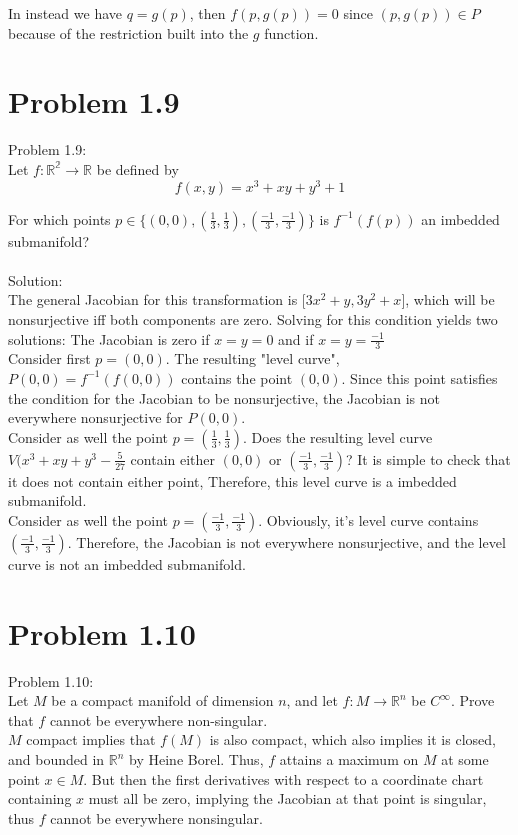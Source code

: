 \documentclass[paper=a4, fontsize=11pt]{scrartcl} %
\numberwithin{equation}{section} %
\numberwithin{figure}{section} %
\numberwithin{table}{section} %
\begin{document}
In instead we have $q = g(p)$, then $f(p, g(p)) = 0$ since $(p, g(p)) \in P$ because of the restriction built into the $g$ function.




\section*{Problem 1.9}

Problem 1.9:\\
Let $f:\mathbb{R^2} \to \mathbb{R}$ be defined by
\[
f(x,y) = x^3 + xy + y^3 + 1
\]

For which points $p \in \{(0,0),(\frac{1}{3},\frac{1}{3}),(\frac{-1}{3},\frac{-1}{3})\}$
is $f^{-1}({f(p)})$ an imbedded submanifold?\\
\\


Solution:\\
The general Jacobian for this transformation is $\big[3x^2 + y, 3y^2 + x\big]$, which will be nonsurjective
iff both components are zero.
Solving for this condition yields two solutions: The Jacobian is zero if $x=y=0$ and if $x=y=\frac{-1}{3}$\\

Consider first $p=(0,0)$. The resulting "level curve", $P(0,0)=f^{-1}({f(0,0)})$ contains the point $(0,0)$.
Since this point satisfies the condition for the Jacobian to be nonsurjective, the Jacobian is not everywhere nonsurjective 
for $P(0,0)$.\\

Consider as well the point $p=(\frac{1}{3},\frac{1}{3})$. 
Does the resulting level curve $V(x^3 + xy + y^3 - \frac{5}{27}$ contain either $(0,0)$ or $(\frac{-1}{3},\frac{-1}{3})$?
It is simple to check that it does not contain either point, Therefore, this level curve is a imbedded submanifold.\\

Consider as well the point $p=(\frac{-1}{3},\frac{-1}{3})$. 
Obviously, it's level curve contains $(\frac{-1}{3},\frac{-1}{3})$. Therefore, the Jacobian is not everywhere nonsurjective, and the level curve is not an imbedded submanifold.

\section*{Problem 1.10}

Problem 1.10:\\

Let $M$ be a compact manifold of dimension $n$, and let $f: M \to \mathbb{R}^n$ be $C^{\infty}.$ Prove that $f$ cannot be everywhere non-singular. \\

$M$ compact implies that $f(M)$ is also compact, which also implies it is closed, and bounded in $\mathbb{R}^n$ by Heine Borel. Thus, $f$ attains a maximum on $M$ at some point $x \in M$. But then the first derivatives with respect to a coordinate chart containing $x$ must all be zero, implying the Jacobian at that point is singular, thus $f$ cannot be everywhere nonsingular.





\end{document}
